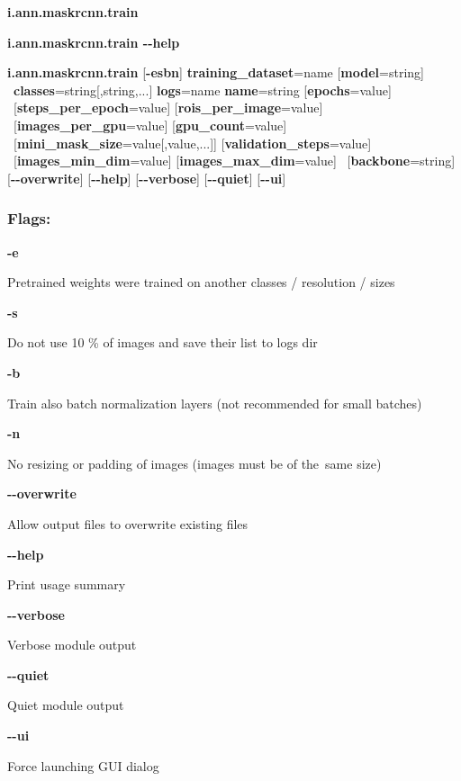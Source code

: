 \begin{flushleft}
\textbf{i.ann.maskrcnn.train} 

\textbf{i.ann.maskrcnn.train -{}-help}

\textbf{i.ann.maskrcnn.train} [\textbf{-esbn}] \textbf{training\_dataset}=name
[\textbf{model}=string] \tab\ \textbf{classes}=string[,string,...]
\textbf{logs}=name \textbf{name}=string [\textbf{epochs}=value] \tab\
[\textbf{steps\_per\_epoch}=value] [\textbf{rois\_per\_image}=value] \tab\
[\textbf{images\_per\_gpu}=value] [\textbf{gpu\_count}=value] \tab\
[\textbf{mini\_mask\_size}=value[,value,...]]
[\textbf{validation\_steps}=value] \tab\ [\textbf{images\_min\_dim}=value]
[\textbf{images\_max\_dim}=value] \tab\ [\textbf{backbone}=string]
[\textbf{-{}-overwrite}] [\textbf{-{}-help}] [\textbf{-{}-verbose}]
[\textbf{-{}-quiet}] [\textbf{-{}-ui}]
\end{flushleft}

\subsubsection*{Flags:}
\begin{flushleft}
  \textbf{-e}
  
  \tab Pretrained weights were trained on another classes / resolution / sizes
  
  \textbf{-s}
  
  \tab Do not use 10 \% of images and save their list to logs dir
  
  \textbf{-b}
  
  \tab Train also batch normalization layers (not recommended for small
  batches)

  \textbf{-n}
  
  \tab No resizing or padding of images (images must be of the~same size)
  
  \textbf{-{}-overwrite}
  
  \tab Allow output files to overwrite existing files
  
  \textbf{-{}-help}
  
  \tab Print usage summary
  
  \textbf{-{}-verbose}
  
  \tab Verbose module output
  
  \textbf{-{}-quiet}
  
  \tab Quiet module output
  
  \textbf{-{}-ui}
  
  \tab Force launching GUI dialog
\end{flushleft}

